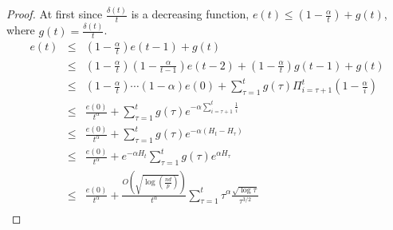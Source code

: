 \begin{proof}
At first since $\frac{\delta(t)}{t}$ is a decreasing function, $e(t)\leq (1-\frac{\alpha}{t}) + g(t)$, where $g(t)=\frac{\delta(t)}{t}$.
\begin{eqnarray*}
 e(t) &\leq& (1-\frac{\alpha}{t})e(t-1) + g(t)\\
 &\leq& (1-\frac{\alpha}{t})(1-\frac{\alpha}{t-1})e(t-2) + (1-\frac{\alpha}{t})g(t-1) + g(t)\\
&\leq& (1-\frac{\alpha}{t})\cdots (1-\alpha)e(0) + \sum_{\tau=1}^t g(\tau)\Pi_{i=\tau+1}^t(1-\frac{\alpha}{i})\\
 &\leq& \frac{e(0)}{t^\alpha} + \sum_{\tau=1}^tg(\tau)e^{-\alpha\sum_{i=\tau+1}^t\frac{1}{i}}\\
 &\leq& \frac{e(0)}{t^\alpha} + \sum_{\tau=1}^tg(\tau)e^{-\alpha(H_t-H_{\tau})}\\
 &\leq& \frac{e(0)}{t^\alpha} + e^{-\alpha H_t}\sum_{\tau=1}^tg(\tau)e^{\alpha H_{\tau}}\\
  &\leq& \frac{e(0)}{t^\alpha} + \frac{O(\sqrt{\log(\frac{nd}{p})})}{t^\alpha}\sum_{\tau=1}^t\tau^\alpha\frac{\sqrt{\log \tau}}{\tau^{3/2}}\\
 \end{eqnarray*}

\end{proof}


